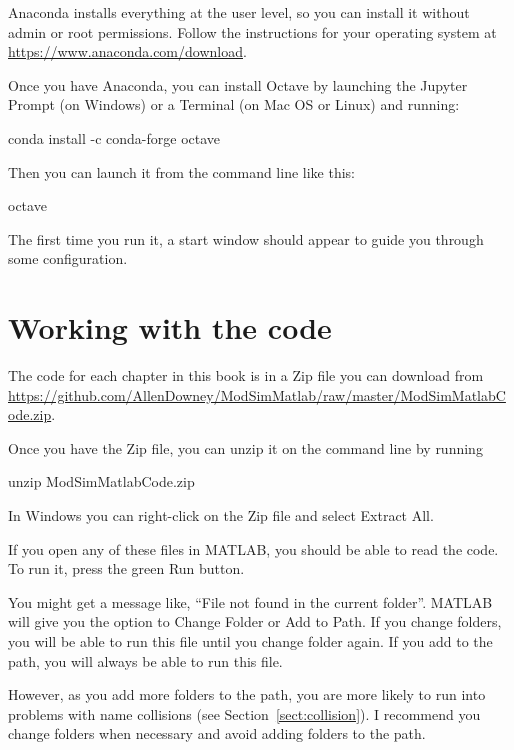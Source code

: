 \documentclass[main.tex]{subfiles}
\begin{document}
Anaconda installs everything at the user level, so you can install it without admin or root permissions.  Follow the instructions for your operating system at \url{https://www.anaconda.com/download}.

Once you have Anaconda, you can install Octave by launching the Jupyter Prompt (on Windows) or a Terminal (on Mac OS or Linux) and running:

\begin{code}
conda install -c conda-forge octave
\end{code}

Then you can launch it from the command line like this:

\begin{code}
octave
\end{code}

The first time you run it, a start window should appear to guide you through some configuration.


\section*{Working with the code}


The code for each chapter in this book is in a Zip file you can download from \url{https://github.com/AllenDowney/ModSimMatlab/raw/master/ModSimMatlabCode.zip}.

Once you have the Zip file, you can unzip it on the command line by running

\begin{code}
unzip ModSimMatlabCode.zip
\end{code}

In Windows you can right-click on the Zip file and select {\sf Extract All}.

If you open any of these files in MATLAB, you should be able to read the code.  To run it, press the green {\sf Run} button.

You might get a message like, ``File not found in the current folder''.
MATLAB will give you the option to {\sf Change Folder} or {\sf Add to Path}.  If you change folders, you will be able to run this file until you change folder again.  If you add to the path, you will always be able to run this file.

However, as you add more folders to the path, you are more likely to run into problems with name collisions (see Section~\ref{sect:collision}).  I recommend you change folders when necessary and avoid adding folders to the path.
\end{document}

